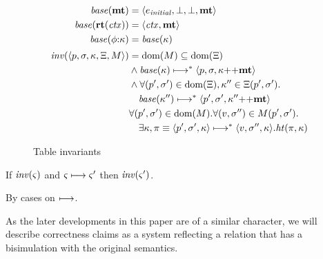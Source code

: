 \begin{figure}
  \centering
  \begin{align*}
    \startstate(\kmt) &= \tpl{\mexpr_\mathit{initial}, \bot, \bot, \kmt} \\
    \startstate(\krt{\mctx}) &= \tpl{\mctx, \kmt} \\    
    \startstate(\kcons{\mkframe}{\mkont}) &= \startstate(\mkont)
 \\[2pt]
    \inv(\tpl{\mpoint, \mstore, \mkont, \mktab, \mmemo}) &=
    \dom(\mmemo) \subseteq \dom(\mktab) \\ %
    &\wedge \startstate(\mkont) \stepto^* \tpl{\mpoint, \mstore,\append{\mkont}{\kmt}} \\
    &\wedge \forall (\mpoint',\mstore') \in \dom(\mktab), \mkont''
    \in \mktab(\mpoint',\mstore'). \\
    &\quad\startstate(\mkont'') \stepto^* \tpl{\mpoint',\mstore',\append{\mkont''}{\kmt}} \\
    &\forall(\mpoint',\mstore') \in \dom(\mmemo).
      \forall (\mval,\mstore'') \in \mmemo(\mpoint',\mstore').
      \\ & \quad
       \exists \mkont, \mtrace\equiv\tpl{\mpoint',\mstore',\mkont}\stepto^* \tpl{\mval,\mstore'',\mkont}.
         \hastail(\mtrace,\mkont)
  \end{align*}
  \caption{Table invariants}
\label{fig:inv}
\end{figure}
\begin{lemma}\label{lem:tab-inv}
  If $\mathit{inv}(\varsigma)$ and $\varsigma \longmapsto \varsigma'$ then $\mathit{inv}(\varsigma')$.
\end{lemma}
  By cases on $\longmapsto$.

As the later developments in this paper are of a similar character, we will describe correctness claims as a system reflecting a relation that has a bisimulation with the original semantics.